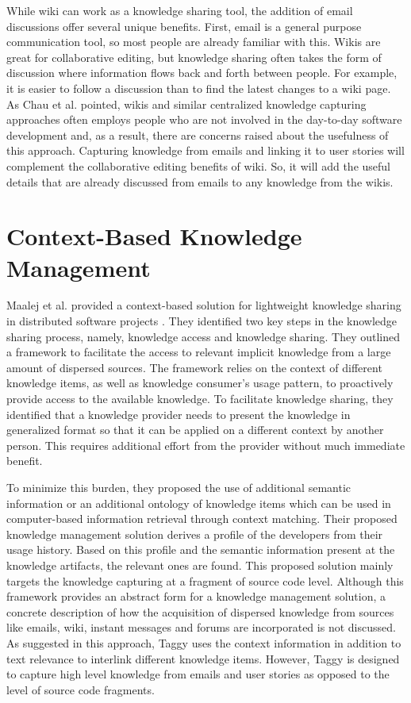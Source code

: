 While wiki can work as a knowledge sharing tool, the addition of email discussions offer several unique benefits. First, email is a general purpose communication tool, so most people are already familiar with this. Wikis are great for collaborative editing, but knowledge sharing often takes the form of discussion where information flows back and forth between people. For example, it is easier to follow a discussion than to find the latest changes to a  wiki page. As Chau et al. pointed, wikis and similar centralized knowledge capturing approaches often employs people who are not involved in the day-to-day software development and, as a result, there are concerns raised about the usefulness of this approach\cite{a_case_study_of_wiki}. Capturing knowledge from emails and linking it to user stories will complement the collaborative editing benefits of wiki. So, it will add the useful details that are already discussed from emails to any knowledge from the wikis.

\section{Context-Based Knowledge Management}
Maalej et al. provided a context-based solution for lightweight knowledge sharing in distributed software projects \cite{a_lightweight}. They identified two key steps in the knowledge sharing process, namely, knowledge access and knowledge sharing. They outlined a framework to facilitate the access to relevant implicit knowledge from a large amount of dispersed sources. The framework relies on the context of different knowledge items, as well as knowledge consumer's usage pattern, to proactively provide access to the available knowledge. To facilitate knowledge sharing, they identified that a knowledge provider needs to present the knowledge in generalized format so that it can be applied on a different context by another person. This requires additional effort from the provider without much immediate benefit.

To minimize this burden, they proposed the use of additional semantic information or an additional ontology of knowledge items which can be used in computer-based information retrieval through context matching. Their proposed knowledge management solution derives a profile of the developers from their usage history. Based on this profile and the semantic information present at the knowledge artifacts, the relevant ones are found. This proposed solution mainly targets the knowledge capturing at a fragment of source code level. Although this framework provides an abstract form for a knowledge management solution, a concrete description of how the acquisition of dispersed knowledge from sources like emails, wiki, instant messages and forums are incorporated is not discussed. As suggested in this approach, Taggy uses the context information in addition to text relevance to interlink different knowledge items. However, Taggy is designed to capture high level knowledge from emails and user stories as opposed to the level of source code fragments.

